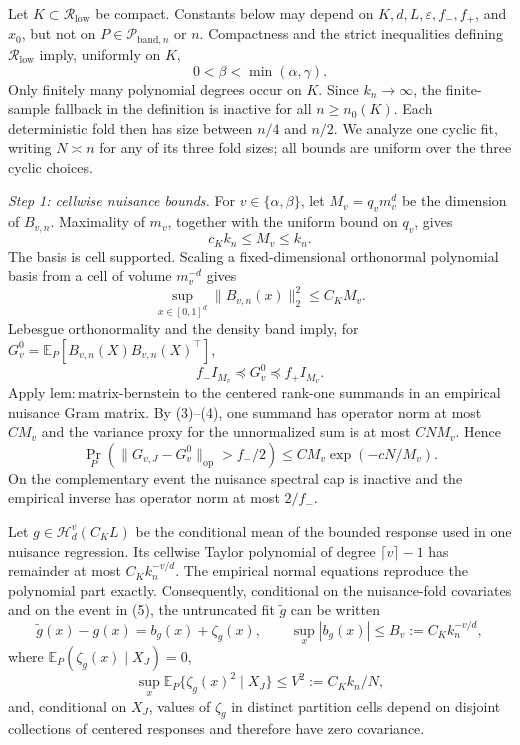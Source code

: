 Let \(K\subset\mathcal R_{\mathrm{low}}\) be compact.  Constants below may
depend on \(K,d,L,\varepsilon,f_{-},f_{+}\), and \(x_0\), but not on
\(P\in\mathcal P_{\mathrm{band},n}\) or \(n\).  Compactness and the strict
inequalities defining \(\mathcal R_{\mathrm{low}}\) imply, uniformly on
\(K\),
\[
0<\beta<\min(\alpha,\gamma).
\tag{1}
\]
Only finitely many polynomial degrees occur on \(K\).  Since \(k_n\to
\infty\), the finite-sample fallback in the definition is inactive for all
\(n\ge n_0(K)\).  Each deterministic fold then has size between \(n/4\)
and \(n/2\).  We analyze one cyclic fit, writing \(N\asymp n\) for any of
its three fold sizes; all bounds are uniform over the three cyclic choices.

\emph{Step 1: cellwise nuisance bounds.}
For \(v\in\{\alpha,\beta\}\), let \(M_v=q_vm_v^d\) be the dimension of
\(B_{v,n}\).  Maximality of \(m_v\), together with the uniform bound on
\(q_v\), gives
\[
c_Kk_n\le M_v\le k_n.
\tag{2}
\]
The basis is cell supported.  Scaling a fixed-dimensional orthonormal
polynomial basis from a cell of volume \(m_v^{-d}\) gives
\[
\sup_{x\in[0,1]^d}\|B_{v,n}(x)\|_2^2\le C_KM_v.
\tag{3}
\]
Lebesgue orthonormality and the density band imply, for
\(G_v^0=\mathbb E_P[B_{v,n}(X)B_{v,n}(X)^\top]\),
\[
f_-I_{M_v}\preceq G_v^0\preceq f_+I_{M_v}.
\tag{4}
\]
Apply \(\mathrm{lem:matrix\mbox{-}bernstein}\) to the centered rank-one
summands in an empirical nuisance Gram matrix.  By (3)--(4), one summand has
operator norm at most \(C M_v\) and the variance proxy for the unnormalized
sum is at most \(C NM_v\).  Hence
\[
\Pr_P\!\left(\|G_{v,J}-G_v^0\|_{\mathrm{op}}>f_-/2\right)
\le C M_v\exp(-cN/M_v).
\tag{5}
\]
On the complementary event the nuisance spectral cap is inactive and the
empirical inverse has operator norm at most \(2/f_-\).

Let \(g\in\mathcal H_d^v(C_KL)\) be the conditional mean of the bounded
response used in one nuisance regression.  Its cellwise Taylor polynomial of
degree \(\lceil v\rceil-1\) has remainder at most \(C_Kk_n^{-v/d}\).
The empirical normal equations reproduce the polynomial part exactly.
Consequently, conditional on the nuisance-fold covariates and on the event in
(5), the untruncated fit \(\widetilde g\) can be written
\[
\widetilde g(x)-g(x)=b_g(x)+\zeta_g(x),
\qquad
\sup_x|b_g(x)|\le B_v:=C_Kk_n^{-v/d},
\tag{6}
\]
where \(\mathbb E_P(\zeta_g(x)\mid X_J)=0\),
\[
\sup_x\mathbb E_P\{\zeta_g(x)^2\mid X_J\}
\le V^2:=C_Kk_n/N,
\tag{7}
\]
and, conditional on \(X_J\), values of \(\zeta_g\) in distinct partition
cells depend on disjoint collections of centered responses and therefore have
zero covariance.


